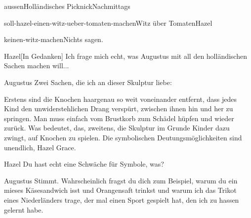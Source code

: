 \documentclass[12pt]{article}
\begin{document}
\begin{scene}{aussen}{Holländisches Picknick}{Nachmittags}
\begin{decision}{soll-hazel-einen-witz-ueber-tomaten-machen}{Witz über Tomaten}{Hazel}
            \begin{option}{keinen-witz-machen}{Nichts sagen.}
            \end{option}
        \end{decision}


        \begin{dialog}{Hazel}[In Gedanken]
            Ich frage mich echt, was Augustus mit all den holländischen Sachen machen will...
        \end{dialog}


        \begin{dialog}{Augustus}
            Zwei Sachen, die ich an dieser Skulptur liebe:


            Erstens sind die Knochen haargenau so weit voneinander entfernt, dass jedes Kind den unwiderstehlichen Drang verspürt, zwischen ihnen hin und her zu springen.
            Man muss einfach vom Brustkorb zum Schädel hüpfen und wieder zurück.
            Was bedeutet, das, zweitens, die Skulptur im Grunde Kinder dazu zwingt, auf Knochen zu spielen.
            Die symbolischen Deutungsmöglichkeiten sind unendlich, Hazel Grace.
        \end{dialog}

        \begin{dialog}{Hazel}
            Du hast echt eine Schwäche für Symbole, was?
        \end{dialog}

        \begin{dialog}{Augustus}
            Stimmt.
            Wahrscheinlich fragst du dich zum Beispiel, warum du ein mieses Käsesandwich isst und Orangensaft trinkst und warum ich das Trikot eines Niederländers trage, der mal einen Sport gespielt hat, den ich zu hassen gelernt habe.
        \end{dialog}


\end{scene}
\end{document}
